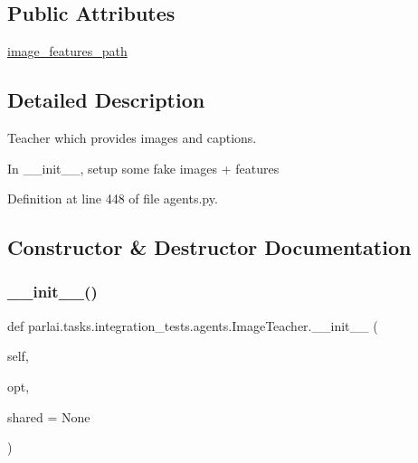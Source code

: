 \subsection*{Public Attributes}
\begin{DoxyCompactItemize}
\item 
\hyperlink{classparlai_1_1tasks_1_1integration__tests_1_1agents_1_1ImageTeacher_a252433e0d09c09207362b031aa295696}{image\+\_\+features\+\_\+path}
\end{DoxyCompactItemize}


\subsection{Detailed Description}
\begin{DoxyVerb}Teacher which provides images and captions.

In __init__, setup some fake images + features
\end{DoxyVerb}
 

Definition at line 448 of file agents.\+py.



\subsection{Constructor \& Destructor Documentation}
\mbox{\label{classparlai_1_1tasks_1_1integration__tests_1_1agents_1_1ImageTeacher_a3341d0d235586140b1c0c231a21182ff}} 
\subsubsection{\texorpdfstring{\+\_\+\+\_\+init\+\_\+\+\_\+()}{\_\_init\_\_()}}
{\footnotesize\ttfamily def parlai.\+tasks.\+integration\+\_\+tests.\+agents.\+Image\+Teacher.\+\_\+\+\_\+init\+\_\+\+\_\+ (\begin{DoxyParamCaption}\item[{}]{self,  }\item[{}]{opt,  }\item[{}]{shared = {\ttfamily None} }\end{DoxyParamCaption})}




